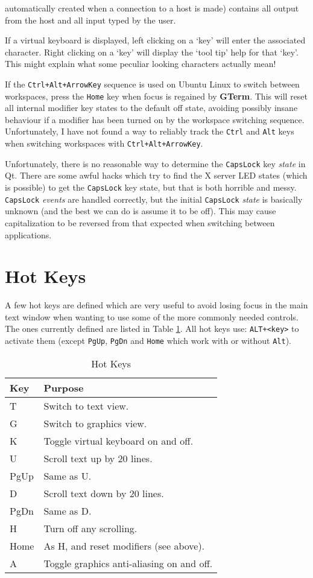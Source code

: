 \documentclass[a4paper,twoside,11pt]{article}
\newcommand{\newpara}{\par\vspace{4mm}\noindent}
\begin{document}
automatically created when a connection to a host is made) contains all output from the host and all input
typed by the user.
\newpara
If a virtual keyboard is displayed, left clicking on a `key' will enter the associated character.
Right clicking on a `key' will display the `tool tip' help for that `key'. This might explain what
some peculiar looking characters actually mean!
\newpara
If the \texttt{Ctrl+Alt+ArrowKey} sequence is used on Ubuntu Linux to switch between workspaces, press 
the \texttt{Home} key when focus is regained by \textbf{GTerm}. This will reset all internal modifier key states
to the default off state, avoiding possibly insane behaviour if a modifier has been turned on by
the workspace switching sequence.
Unfortunately, I have not found a way to reliably
track the \texttt{Ctrl} and \texttt{Alt} keys when switching workspaces with \texttt{Ctrl+Alt+ArrowKey}.
\newpara
Unfortunately, there is no reasonable way to determine the \texttt{CapsLock} key \textit{state}
in Qt. There are some awful hacks which try to find the X server LED states (which is possible) to
get the \texttt{CapsLock} key state, but that is both horrible and messy. 
\texttt{CapsLock} \textit{events} are handled correctly,
but the initial \texttt{CapsLock} \textit{state} is basically unknown (and the
best we can do is assume it to be off). This may cause capitalization to be reversed from
that expected when switching between applications.

\section{Hot Keys}
A few hot keys are defined which are very useful to avoid losing focus in the main text window when
wanting to use some of the more commonly needed controls. The ones currently defined are listed in
Table \ref{tab:hotkeys}. All hot keys use: \texttt{ALT+<key>} to activate them (except \texttt{PgUp},
\texttt{PgDn} and \texttt{Home} which work with or without \texttt{Alt}).

\begin{table}
\centering
\begin{tabular}{|| l | l ||}
\hline
Key & Purpose\\
\hline
T  & Switch to text view.\\
G  & Switch to graphics view.\\
K  & Toggle virtual keyboard on and off.\\
U  & Scroll text up by 20 lines.\\
PgUp  & Same as U.\\
D  & Scroll text down by 20 lines.\\
PgDn  & Same as D.\\
H  & Turn off any scrolling.\\
Home & As H, and reset modifiers (see above). \\
A  & Toggle graphics anti-aliasing on and off.\\
\hline
\end{tabular}
\caption{Hot Keys}
\label{tab:hotkeys}
\end{table}
\end{document}
